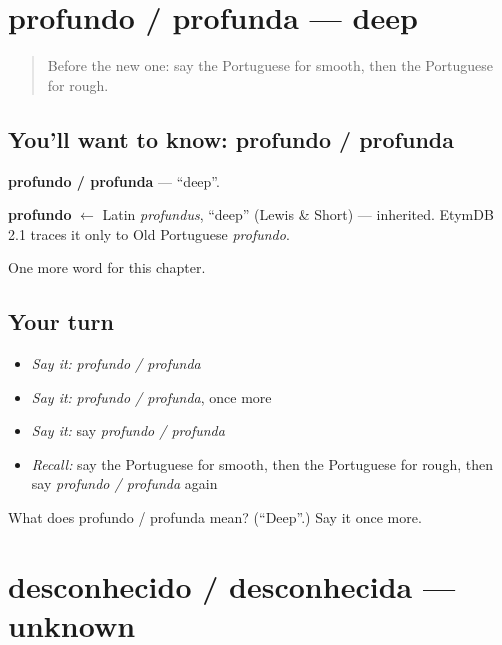 \section[profundo / profunda]{profundo / profunda — deep}

\label{lesson:PT-C241-profundo-profunda}



\begin{quote}
Before the new one: say the Portuguese for smooth, then the Portuguese for rough.
\end{quote}

\subsection*{You'll want to know: profundo / profunda}
\textbf{profundo / profunda} — \textquotedblleft{}deep\textquotedblright{}.

\begin{cousinweb}
\textbf{profundo} $\leftarrow$ Latin \emph{profundus}, \textquotedblleft{}deep\textquotedblright{} (Lewis \& Short) — inherited. EtymDB 2.1 traces it only to Old Portuguese \emph{profundo}.
\end{cousinweb}

\begin{grammarlens}[title={What you've built}]
One more word for this chapter.
\end{grammarlens}

\subsection*{Your turn}
\begin{itemize}
\raggedright
  \item \emph{Say it:} \emph{profundo / profunda}
  \item \emph{Say it:} \emph{profundo / profunda}, once more
  \item \emph{Say it:} say \emph{profundo / profunda}
  \item \emph{Recall:} say the Portuguese for smooth, then the Portuguese for rough, then say \emph{profundo / profunda} again
\end{itemize}

\begin{tcolorbox}[breakable,colback=teal!4,colframe=teal!35!black,title={Before you move on}]
What does profundo / profunda mean? (\textquotedblleft{}Deep\textquotedblright{}.) Say it once more.
\end{tcolorbox}
\section[desconhecido / desconhecida]{desconhecido / desconhecida — unknown}

